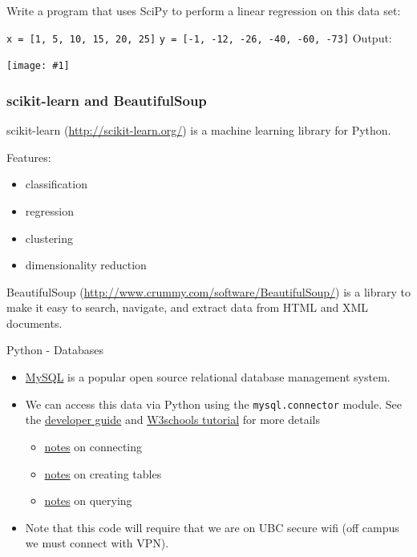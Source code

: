 \documentclass[xcolor=svgnames]{beamer}
\newcommand{\nl}{\\[1em]}
\newcommand{\ipic}[2]{\texttt{[image: \#1]}}
\newcommand{\ft}[1]{\frametitle{#1}}
\begin{document}
\begin{frame}
\begin{example}
 Write a program that uses SciPy to perform a linear regression on this data set:
 
{\tt x = [1, 5, 10, 15, 20, 25]} \newline
{\tt y = [-1, -12, -26, -40, -60, -73]}\newline
Output:
\end{example}
\begin{center}
\ipic{scipy}{0.6}
\end{center}
\end{frame}


\begin{frame}[fragile]\ft{scikit-learn and BeautifulSoup}
scikit-learn (\url{http://scikit-learn.org/}) is a machine learning library for Python.

Features:
\begin{itemize}
\item  classification
\item regression
\item clustering
\item dimensionality reduction

\end{itemize}

BeautifulSoup (\url{http://www.crummy.com/software/BeautifulSoup/}) is a library to make it easy to search, navigate, and extract data from HTML and XML documents.

\end{frame}



\begin{frame}{Python - Databases}
\begin{itemize}
\item \href{https://www.mysql.com/}{MySQL} is a popular open source relational database management system.\nl
\item We can access this data via Python using the {\tt mysql.connector} module. See the  \href{https://dev.mysql.com/doc/connector-python/en/}{developer guide} and \href{https://www.w3schools.com/python/python_mysql_getstarted.asp}{W3schools tutorial} for more details
\begin{itemize}
\item \href{https://dev.mysql.com/doc/connector-python/en/connector-python-example-connecting.html}{notes} on connecting
\item \href{https://dev.mysql.com/doc/connector-python/en/connector-python-example-ddl.html}{notes} on creating tables
\item \href{https://dev.mysql.com/doc/connector-python/en/connector-python-example-cursor-select.html}{notes} on querying\nl
\end{itemize}

\item Note that this code will require that we are on UBC secure wifi (off campus we must connect with VPN).\nl
\end{itemize}
\end{frame}
\end{document}
